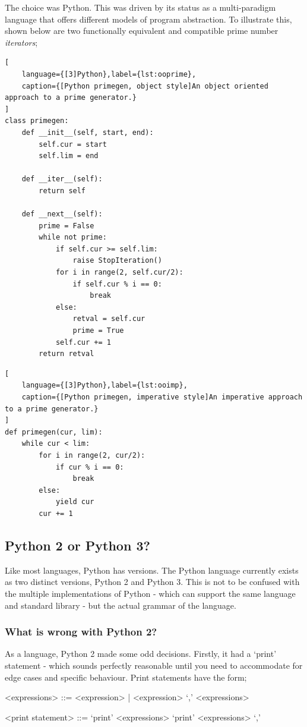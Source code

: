 \documentclass[10pt,a4paper,notitlepage,twoside]{report}
\begin{document}
The choice was Python. This was driven by its status as a multi-paradigm language that offers different models of program abstraction.
To illustrate this, shown below are two functionally equivalent and compatible prime number \emph{iterators};
\begin{lstlisting}[
	language={[3]Python},label={lst:ooprime},
	caption={[Python primegen, object style]An object oriented approach to a prime generator.}
]
class primegen:
    def __init__(self, start, end):
        self.cur = start
        self.lim = end

    def __iter__(self):
        return self

    def __next__(self):
        prime = False
        while not prime:
            if self.cur >= self.lim:
                raise StopIteration()
            for i in range(2, self.cur/2):
                if self.cur % i == 0:
                    break
            else:
                retval = self.cur
                prime = True
            self.cur += 1
        return retval
\end{lstlisting}

\begin{lstlisting}[
	language={[3]Python},label={lst:ooimp},
	caption={[Python primegen, imperative style]An imperative approach to a prime generator.}
]
def primegen(cur, lim):
    while cur < lim:
        for i in range(2, cur/2):
            if cur % i == 0:
                break
        else:
            yield cur
        cur += 1

\end{lstlisting}

\subsection{Python 2 or Python 3?}
Like most languages, Python has versions. The Python language currently exists as two distinct versions, Python 2 and Python 3. This is not to be confused with the multiple implementations of Python - which can support the same language and standard library - but the actual grammar of the language.

\subsubsection{What is wrong with Python 2?}
As a language, Python 2 made some odd decisions. Firstly, it had a `print' statement - which sounds perfectly reasonable until you need to accommodate for edge cases and specific behaviour. Print statements have the form;
\begin{grammar}
<expressions> ::= <expression> | <expression> `,' <expressions>

<print statement> ::= `print' <expressions>
\alt `print' <expressions> `,'
\end{grammar}
\end{document}
